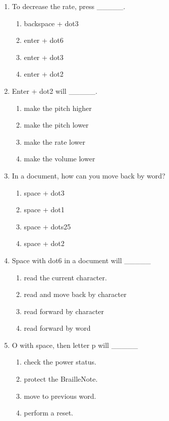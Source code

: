 \documentclass[10pt,letterpaper,twoside]{report}
\begin{document}
{\begin{enumerate}
\begin{enumerate}
		      \item make the volume louder
	      \end{enumerate}
	\item To decrease the rate, press \_\_\_\_\_.
	      \begin{enumerate}
		      \item backspace + dot3
		      \item enter + dot6
		      \item enter + dot3
		      \item enter + dot2
	      \end{enumerate}
	\item Enter + dot2 will \_\_\_\_\_.
	      \begin{enumerate}
		      \item make the pitch higher
		      \item make the pitch lower
		      \item make the rate lower
		      \item make the volume lower
	      \end{enumerate}
	\item In a document, how can you move back by word?
	      \begin{enumerate}
		      \item space + dot3
		      \item space + dot1
		      \item space + dots25
		      \item space + dot2
	      \end{enumerate}
	\item Space with dot6 in a document will \_\_\_\_\_
	      \begin{enumerate}
		      \item read the current character.
		      \item read and move back by character
		      \item read forward by character
		      \item read forward by word
	      \end{enumerate}
	\item O with space, then letter p will \_\_\_\_\_
	      \begin{enumerate}
		      \item check the power status.
		      \item protect the BrailleNote.
		      \item move to previous word.
		      \item perform a reset.
	      \end{enumerate}
\end{enumerate}

}
\end{document}
